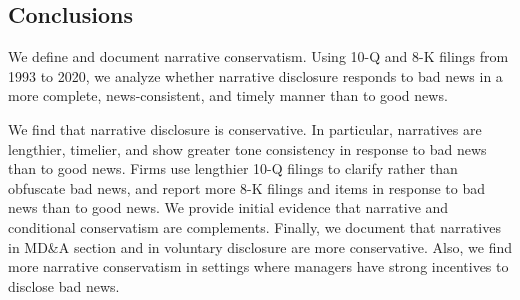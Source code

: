 \documentclass[letterpaper,11pt]{article}
\begin{document}
\begin{spacing}{1.5}
\section{Conclusions}

\noindent We define and document narrative conservatism. Using 10-Q and 8-K filings from 1993 to 2020, we analyze whether narrative disclosure responds to bad news in a more complete, news-consistent, and timely manner than to good news. 

We find that narrative disclosure is conservative. In particular, narratives are lengthier, timelier, and show greater tone consistency in response to bad news than to good news. Firms use lengthier 10-Q filings to clarify rather than obfuscate bad news, and report more 8-K filings and items in response to bad news than to good news. We provide initial evidence that narrative and conditional conservatism are complements. Finally, we document that narratives in MD\&A section and in voluntary disclosure are more conservative. Also, we find more narrative conservatism in settings where managers have strong incentives to disclose bad news.


\end{spacing}

\newpage



\newpage


\newpage


\newpage


\newpage
\setcounter{page}{1}

\end{document}
